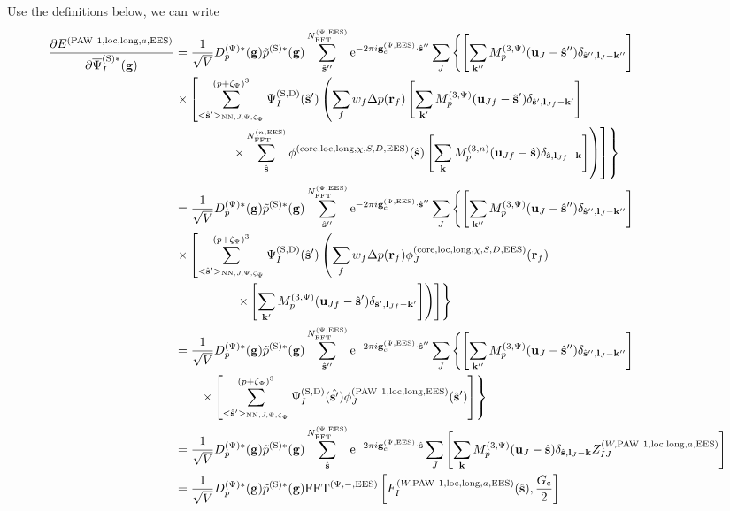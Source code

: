\documentclass[paper=a4, fontsize=11pt]{article} %
\numberwithin{equation}{section} %
\numberwithin{figure}{section} %
\numberwithin{table}{section} %
\newcommand{\p}{\partial}
\newcommand{\bu}{{\bf{u}}}
\newcommand{\bl}{{\bf{l}}}
\newcommand{\bk}{{\bf{k}}}
\newcommand{\bs}{{\bf{s}}}
\newcommand{\bg}{{\bf{g}}}
\newcommand{\br}{{\bf{r}}}
\newcommand{\hs}{{\hat{\bf{s}}}}
\newcommand{\rS}{{\mathrm{S}}}
\newcommand{\rEES}{{\mathrm{EES}}}
\newcommand{\rcore}{{\mathrm{core}}}
\newcommand{\rNN}{{\mathrm{NN}}}
\newcommand{\re}{{\mathrm{e}}}
\newcommand{\rlong}{{\mathrm{long}}}
\newcommand{\rP}{{\mathrm{PAW}}}
\newcommand{\rD}{{\mathrm{D}}}
\newcommand{\rlo}{{\mathrm{loc}}}
\newcommand{\gcpEES}{{\bg_c^{(\Psi,\rEES)}}}
\newcommand{\psigsc}{{\overline \Psi_I^{(\rS)*}(\bg)}}
\newcommand{\NFFTnEES}{{N^{(n,\rEES)}_{\mathrm{FFT}}}}
\newcommand{\NFFTpEES}{{N^{\mathrm{(\Psi,\rEES})}_{\mathrm{FFT}}}}
\newcommand{\hGc}{{\frac{G_{\mathrm{c}}}{2}}}
\newcommand{\Dpgc}{{D^{(\Psi)*}_p(\bg)}}
\newcommand{\Mn}{{M_p^{(3,n)}}}
\newcommand{\Mp}{{M_p^{(3,\Psi)}}}
\newcommand{\FFTpiEES}{{\mathrm{FFT}^{(\Psi,-,\rEES)}}}
\newcommand{\pzp}{{(p+\zeta_{\Psi})^3}}
\newcommand{\hspJp}{{<\hs'>_{\rNN,J,\Psi,\zeta_\Psi}}}
\begin{document}
Use the definitions below, we can write
\begin{equation}
\begin{split}
\frac{\p E^{(\rP\ 1,\rlo,\rlong,a,\rEES)}}{ \p \psigsc}
&= \frac{1}{\sqrt{V}} \Dpgc \tilde p^{(\rS)*}(\bg) \sum_{\hat \bs''}^\NFFTpEES \re^{-2\pi i\gcpEES \cdot \hat\bs''} \sum_J \left\{\left[\sum_{\bk''} \Mp(\bu_{J}-\hat \bs'') \delta_{\hat \bs'',\bl_J-\bk''}\right]\right.\\
&\left.\times \left[ \sum_{\hspJp}^\pzp \Psi_{I}^{(\rS,\rD)}(\hat \bs') \left( \sum_f w_f \Delta p(\br_f)  \left[\sum_{\bk'} \Mp(\bu_{Jf}-\hat \bs') \delta_{\hat \bs',\bl_{Jf}-\bk'}\right] \right. \right. \right.\\ 
&\left.\left.\left. \ \ \ \ \ \ \ \ \ \ \ \ \ \times \sum_{\hat \bs}^\NFFTnEES \phi^{(\rcore,\rlo,\rlong,\chi,S,D,\rEES)}(\hs) \left[\sum_{\bk} \Mn(\bu_{Jf}-\hat \bs) \delta_{\hat \bs,\bl_{Jf}-\bk}\right]  \right) \right] \right\}\\
&= \frac{1}{\sqrt{V}} \Dpgc \tilde p^{(\rS)*}(\bg) \sum_{\hat \bs''}^\NFFTpEES \re^{-2\pi i\gcpEES \cdot \hat\bs''} \sum_J \left\{ \left[\sum_{\bk''} \Mp(\bu_{J}-\hat \bs'') \delta_{\hat \bs'',\bl_J-\bk''}\right]\right.\\
&\left.\times \left[\sum_{\hspJp}^\pzp \Psi_{I}^{(\rS,\rD)}(\hat \bs') \left(\sum_f w_f \Delta p(\br_f) \phi_J^{(\rcore,\rlo,\rlong,\chi,S,D,\rEES)}(\br_f) \right. \right. \right.\\
&\left. \left. \left. \ \ \ \ \ \ \ \ \ \ \ \ \ \ \times \left[\sum_{\bk'} \Mp(\bu_{Jf}-\hat \bs') \delta_{\hat \bs',\bl_{Jf}-\bk'} \right]\right)\right]\right\}\\
&= \frac{1}{\sqrt{V}} \Dpgc \tilde p^{(\rS)*}(\bg) \sum_{\hat \bs''}^\NFFTpEES \re^{-2\pi i\gcpEES \cdot \hat\bs''} \sum_J \left\{ \left[\sum_{\bk''} \Mp(\bu_{J}-\hat \bs'') \delta_{\hat \bs'',\bl_J-\bk''}\right]\right.\\
&\left.\ \ \ \ \ \ \times \left[\sum_{\hspJp}^\pzp \Psi_{I}^{(\rS,\rD)}(\hat {\bs'}) \phi_J^{(\rP\ 1,\rlo,\rlong,\rEES)}(\hs')\right]\right\}\\
&= \frac{1}{\sqrt{V}} \Dpgc \tilde p^{(\rS)*}(\bg) \sum_{\hs}^\NFFTpEES\re^{-2\pi i\gcpEES \cdot \hs} \sum_J \left[\sum_{\bk} \Mp(\bu_{J}-\hs) \delta_{\hs,\bl_J-\bk}Z_{IJ}^{(W,\rP\ 1,\rlo,\rlong,a,\rEES)}\right]\\
&= \frac{1}{\sqrt{V}} \Dpgc \tilde p^{(\rS)*}(\bg) \FFTpiEES \left[ F_I^{(W,\rP\ 1,\rlo,\rlong,a,\rEES)}(\hs) ,\hGc \right]\\
\end{split}
\end{equation}
\end{document}

